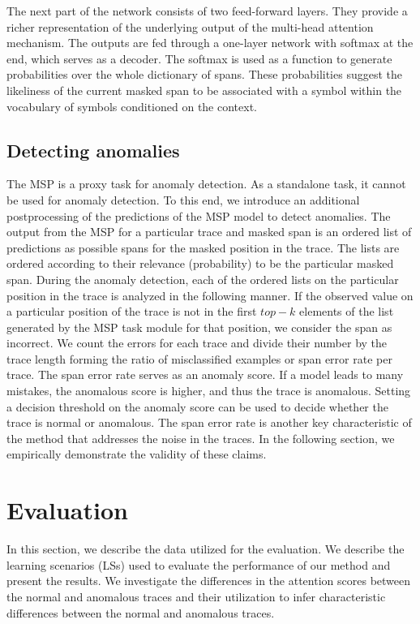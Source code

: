 The next part of the network consists of two feed-forward layers. They provide a richer representation of the underlying output of the multi-head attention mechanism. The outputs are fed through a one-layer network with softmax at the end, which serves as a decoder. The softmax is used as a function to generate probabilities over the whole dictionary of spans. These probabilities suggest the likeliness of the current masked span to be associated with a symbol within the vocabulary of symbols conditioned on the context. 

\subsection{Detecting anomalies}
The MSP is a proxy task for anomaly detection. As a standalone task, it cannot be used for anomaly detection. To this end, we introduce an additional postprocessing of the predictions of the MSP model to detect anomalies. The output from the MSP for a particular trace and masked span is an ordered list of predictions as possible spans for the masked position in the trace. The lists are ordered according to their relevance (probability) to be the particular masked span. During the anomaly detection, each of the ordered lists on the particular position in the trace is analyzed in the following manner. If the observed value on a particular position of the trace is not in the first $top-k$ elements of the list generated by the MSP task module for that position, we consider the span as incorrect. We count the errors for each trace and divide their number by the trace length forming the ratio of misclassified examples or span error rate per trace. The span error rate serves as an anomaly score. If a model leads to many mistakes, the anomalous score is higher, and thus the trace is anomalous. Setting a decision threshold on the anomaly score can be used to decide whether the trace is normal or anomalous. The span error rate is another key characteristic of the method that addresses the noise in the traces. In the following section, we empirically demonstrate the validity of these claims.

\newpage

\section{Evaluation}
In this section, we describe the data utilized for the evaluation. We describe the learning scenarios (LSs) used to evaluate the performance of our method and present the results. We investigate the differences in the attention scores between the normal and anomalous traces and their utilization to infer characteristic differences between the normal and anomalous traces.

